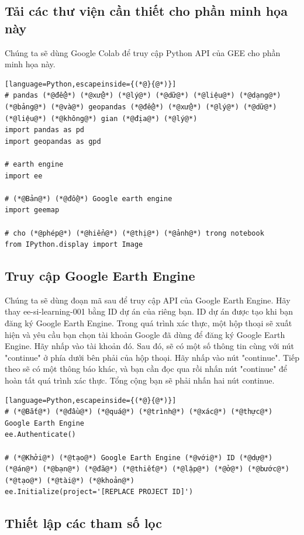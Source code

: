 \subsection{Tải các thư viện cần thiết cho phần minh họa này}

Chúng ta sẽ dùng Google Colab để truy cập Python API của GEE cho phần minh họa này.

\begin{lstlisting}[language=Python,escapeinside={(*@}{@*)}]
# pandas (*@để@*) (*@xử@*) (*@lý@*) (*@dữ@*) (*@liệu@*) (*@dạng@*) (*@bảng@*) (*@và@*) geopandas (*@để@*) (*@xử@*) (*@lý@*) (*@dữ@*) (*@liệu@*) (*@không@*) gian (*@địa@*) (*@lý@*)
import pandas as pd
import geopandas as gpd

# earth engine
import ee

# (*@Bản@*) (*@đồ@*) Google earth engine
import geemap

# cho (*@phép@*) (*@hiển@*) (*@thị@*) (*@ảnh@*) trong notebook
from IPython.display import Image
\end{lstlisting}

\subsection{Truy cập Google Earth Engine}

Chúng ta sẽ dùng đoạn mã sau để truy cập API của Google Earth Engine. Hãy thay \textquotesingle ee-si-learning-001\textquotesingle{} bằng ID dự án của riêng bạn. ID dự án được tạo khi bạn đăng ký Google Earth Engine. Trong quá trình xác thực, một hộp thoại sẽ xuất hiện và yêu cầu bạn chọn tài khoản Google đã dùng để đăng ký Google Earth Engine. Hãy nhấp vào tài khoản đó. Sau đó, sẽ có một số thông tin cùng với nút "continue" ở phía dưới bên phải của hộp thoại. Hãy nhấp vào nút "continue". Tiếp theo sẽ có một thông báo khác, và bạn cần đọc qua rồi nhấn nút "continue" để hoàn tất quá trình xác thực. Tổng cộng bạn sẽ phải nhấn hai nút continue.

\begin{lstlisting}[language=Python,escapeinside={(*@}{@*)}]
# (*@Bắt@*) (*@đầu@*) (*@quá@*) (*@trình@*) (*@xác@*) (*@thực@*) Google Earth Engine
ee.Authenticate()

# (*@Khởi@*) (*@tạo@*) Google Earth Engine (*@với@*) ID (*@dự@*) (*@án@*) (*@bạn@*) (*@đã@*) (*@thiết@*) (*@lập@*) (*@ở@*) (*@bước@*) (*@tạo@*) (*@tài@*) (*@khoản@*)
ee.Initialize(project='[REPLACE PROJECT ID]')
\end{lstlisting}

\subsection{Thiết lập các tham số lọc}

